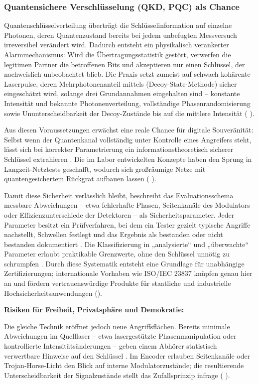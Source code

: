 \subsubsection{Quantensichere Verschlüsselung (QKD, PQC) als Chance}

Quantenschlüsselverteilung überträgt die Schlüsselinformation auf einzelne Photonen, deren Quantenzustand bereits bei jedem unbefugten Messversuch irreversibel verändert wird. Dadurch entsteht ein physikalisch verankerter Alarmmechanismus: Wird die Übertragungsstatistik gestört, verwerfen die legitimen Partner die betroffenen Bits und akzeptieren nur einen Schlüssel, der nachweislich unbeobachtet blieb. Die Praxis setzt zumeist auf schwach kohärente Laserpulse, deren Mehrphotonenanteil mittels (Decoy-State-Methode) sicher eingeschätzt wird, solange drei Grundannahmen eingehalten sind – konstante Intensität und bekannte Photonenverteilung, vollständige Phasenrandomisierung sowie Ununterscheidbarkeit der Decoy-Zustände bis auf die mittlere Intensität (\cite{sunReviewSecurityEvaluation2022} ).

Aus diesen Voraussetzungen erwächst eine reale Chance für digitale Souveränität: Selbst wenn der Quantenkanal vollständig unter Kontrolle eines Angreifers steht, lässt sich bei korrekter Parametrierung ein informationstheoretisch sicherer Schlüssel extrahieren . Die im Labor entwickelten Konzepte haben den Sprung in Langzeit-Netztests geschafft, wodurch sich großräumige Netze mit quantengesichertem Rückgrat aufbauen lassen (\cite{sunReviewSecurityEvaluation2022} ).

Damit diese Sicherheit verlässlich bleibt, beschreibt das Evaluationsschema messbare Abweichungen – etwa fehlerhafte Phasen, Seitenkanäle des Modulators oder Effizienzunterschiede der Detektoren – als Sicherheitsparameter. Jeder Parameter besitzt ein Prüfverfahren, bei dem ein Tester gezielt typische Angriffe nachstellt, Schwellen festlegt und das Ergebnis als bestanden oder nicht bestanden dokumentiert . Die Klassifizierung in „analysierte“ und „überwachte“ Parameter erlaubt praktikable Grenzwerte, ohne den Schlüssel unnötig zu schrumpfen . Durch diese Systematik entsteht eine Grundlage für unabhängige Zertifizierungen; internationale Vorhaben wie ISO/IEC 23837 knüpfen genau hier an und fördern vertrauenswürdige Produkte für staatliche und industrielle Hochsicherheitsanwendungen (\cite{sunReviewSecurityEvaluation2022}).

\textbf{Risiken für Freiheit, Privatsphäre und Demokratie:}

Die gleiche Technik eröffnet jedoch neue Angriffsflächen. Bereits minimale Abweichungen im Quelllaser – etwa lasergestützte Phasenmanipulation oder kontrollierte Intensitätsänderungen – geben einem Abhörer statistisch verwertbare Hinweise auf den Schlüssel . Im Encoder erlauben Seitenkanäle oder Trojan-Horse-Licht den Blick auf interne Modulatorzustände; die resultierende Unterscheidbarkeit der Signalzustände stellt das Zufallsprinzip infrage (\cite{sunReviewSecurityEvaluation2022} ).

